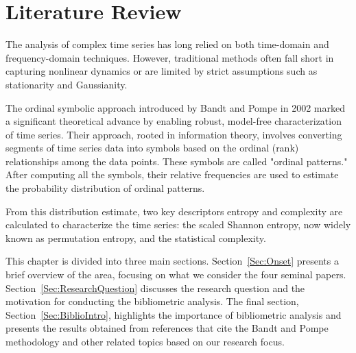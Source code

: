 \chapter{Literature Review}\label{C:lit}

The analysis of complex time series has long relied on both time-domain and frequency-domain techniques. 
However, traditional methods often fall short in capturing nonlinear dynamics or are limited by strict assumptions such as stationarity and Gaussianity. 

The ordinal symbolic approach introduced by Bandt and Pompe in 2002 marked a significant theoretical advance by enabling robust, model-free characterization of time series. 
Their approach, rooted in information theory, involves converting segments of time series data into symbols based on the ordinal (rank) relationships among the data points.
These symbols are called "ordinal patterns." After computing all the symbols, their relative frequencies are used to estimate the probability distribution of ordinal patterns.

From this distribution estimate, two key descriptors entropy and complexity are calculated to characterize the time series: the scaled Shannon entropy, now widely known as permutation entropy, and the statistical complexity.

This chapter is divided into three main sections. Section~\ref{Sec:Onset} presents a brief overview of the area, focusing on what we consider the four seminal papers. Section~\ref{Sec:ResearchQuestion} discusses the research question and the motivation for conducting the bibliometric analysis. The final section, Section~\ref{Sec:BiblioIntro}, highlights the importance of bibliometric analysis and presents the results obtained from references that cite the Bandt and Pompe methodology and other related topics based on our research focus.  




